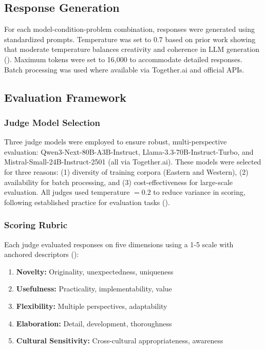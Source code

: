 \documentclass{article}
\begin{document}
\subsection{Response Generation}

For each model-condition-problem combination, responses were generated using standardized prompts. Temperature was set to $0.7$ based on prior work showing that moderate temperature balances creativity and coherence in LLM generation (\cite{yuqing_bai_9d1d72ff}). Maximum tokens were set to 16,000 to accommodate detailed responses. Batch processing was used where available via Together.ai and official APIs.

\subsection{Evaluation Framework}

\subsubsection{Judge Model Selection}

Three judge models were employed to ensure robust, multi-perspective evaluation: Qwen3-Next-80B-A3B-Instruct, Llama-3.3-70B-Instruct-Turbo, and Mistral-Small-24B-Instruct-2501 (all via Together.ai). These models were selected for three reasons: (1) diversity of training corpora (Eastern and Western), (2) availability for batch processing, and (3) cost-effectiveness for large-scale evaluation. All judges used temperature $= 0.2$ to reduce variance in scoring, following established practice for evaluation tasks (\cite{tiannan_wang_d1534114}).

\subsubsection{Scoring Rubric}

Each judge evaluated responses on five dimensions using a 1-5 scale with anchored descriptors (\cite{haririLLMCreativityMeasuringExplaining2025}):

\begin{enumerate}
    \item \textbf{Novelty:} Originality, unexpectedness, uniqueness
    \item \textbf{Usefulness:} Practicality, implementability, value
    \item \textbf{Flexibility:} Multiple perspectives, adaptability
    \item \textbf{Elaboration:} Detail, development, thoroughness
    \item \textbf{Cultural Sensitivity:} Cross-cultural appropriateness, awareness
\end{enumerate}
\end{document}
